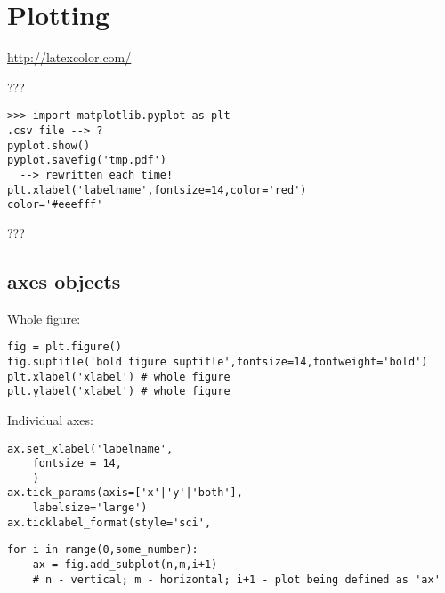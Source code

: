\documentclass{article}
\begin{document}
\section*{Plotting}
\url{http://latexcolor.com/}

???
\begin{verbatim}
>>> import matplotlib.pyplot as plt
.csv file --> ?
pyplot.show()
pyplot.savefig('tmp.pdf')
  --> rewritten each time!
plt.xlabel('labelname',fontsize=14,color='red')
color='#eeefff'
\end{verbatim}
???

\subsection*{axes objects}
Whole figure:
\begin{verbatim}
fig = plt.figure()
fig.suptitle('bold figure suptitle',fontsize=14,fontweight='bold')
plt.xlabel('xlabel') # whole figure
plt.ylabel('xlabel') # whole figure
\end{verbatim}

Individual axes:
\begin{verbatim}
ax.set_xlabel('labelname',
    fontsize = 14,
    )
ax.tick_params(axis=['x'|'y'|'both'],
    labelsize='large')
ax.ticklabel_format(style='sci',
\end{verbatim}

\begin{verbatim}
for i in range(0,some_number):
    ax = fig.add_subplot(n,m,i+1)
    # n - vertical; m - horizontal; i+1 - plot being defined as 'ax'
\end{verbatim}
\end{document}
